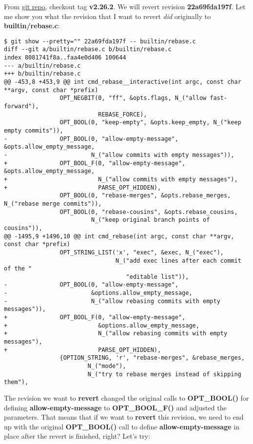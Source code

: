 From \hyperref[git_repo]{git repo}, checkout tag {\bf v2.26.2}. We will revert revision {\bf 22a69fda197f}. Let me show you what the
revision that I want to revert {\it did} originally to {\bf builtin/rebase.c}:

\begin{lstlisting}[style=console_style,
	basicstyle=\tiny,
	caption={\bf example 13} - Original revision]
$ git show --pretty="" 22a69fda197f -- builtin/rebase.c
diff --git a/builtin/rebase.c b/builtin/rebase.c
index 8081741f8a..faa4e0d406 100644
--- a/builtin/rebase.c
+++ b/builtin/rebase.c
@@ -453,8 +453,9 @@ int cmd_rebase__interactive(int argc, const char **argv, const char *prefix)
                OPT_NEGBIT(0, "ff", &opts.flags, N_("allow fast-forward"),
                           REBASE_FORCE),
                OPT_BOOL(0, "keep-empty", &opts.keep_empty, N_("keep empty commits")),
-               OPT_BOOL(0, "allow-empty-message", &opts.allow_empty_message,
-                        N_("allow commits with empty messages")),
+               OPT_BOOL_F(0, "allow-empty-message", &opts.allow_empty_message,
+                          N_("allow commits with empty messages"),
+                          PARSE_OPT_HIDDEN),
                OPT_BOOL(0, "rebase-merges", &opts.rebase_merges, N_("rebase merge commits")),
                OPT_BOOL(0, "rebase-cousins", &opts.rebase_cousins,
                         N_("keep original branch points of cousins")),
@@ -1495,9 +1496,10 @@ int cmd_rebase(int argc, const char **argv, const char *prefix)
                OPT_STRING_LIST('x', "exec", &exec, N_("exec"),
                                N_("add exec lines after each commit of the "
                                   "editable list")),
-               OPT_BOOL(0, "allow-empty-message",
-                        &options.allow_empty_message,
-                        N_("allow rebasing commits with empty messages")),
+               OPT_BOOL_F(0, "allow-empty-message",
+                          &options.allow_empty_message,
+                          N_("allow rebasing commits with empty messages"),
+                          PARSE_OPT_HIDDEN),
                {OPTION_STRING, 'r', "rebase-merges", &rebase_merges,
                        N_("mode"),
                        N_("try to rebase merges instead of skipping them"),
\end{lstlisting}

The revision we want to {\bf revert} changed the original calls to {\bf OPT\_BOOL()} for defining {\bf allow-empty-message}
to {\bf OPT\_BOOL\_F()} and adjusted the parameters. That means that if we want to {\bf revert} this revision, we need to end
up with the original {\bf OPT\_BOOL()} call to define {\bf allow-empty-message} in place after the revert is finished, right?
Let's try:

